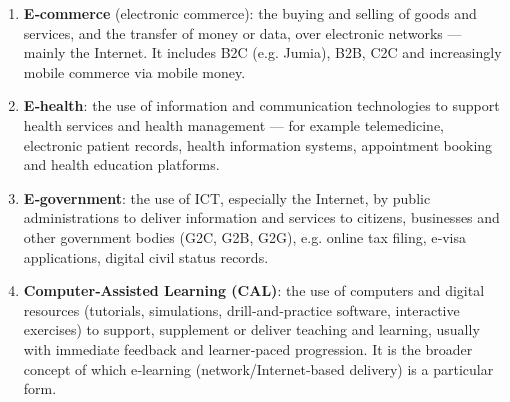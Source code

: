 \documentclass[11pt]{article}
\begin{document}
\begin{corrige}
\begin{enumerate}
\item \textbf{E‑commerce} (electronic commerce): the buying and selling of goods and services, and the transfer of money or data, over electronic networks — mainly the Internet. It includes B2C (e.g. Jumia), B2B, C2C and increasingly mobile commerce via mobile money.

\item \textbf{E‑health}: the use of information and communication technologies to support health services and health management — for example telemedicine, electronic patient records, health information systems, appointment booking and health education platforms.

\item \textbf{E‑government}: the use of ICT, especially the Internet, by public administrations to deliver information and services to citizens, businesses and other government bodies (G2C, G2B, G2G), e.g. online tax filing, e‑visa applications, digital civil status records.

\item \textbf{Computer‑Assisted Learning (CAL)}: the use of computers and digital resources (tutorials, simulations, drill‑and‑practice software, interactive exercises) to support, supplement or deliver teaching and learning, usually with immediate feedback and learner‑paced progression. It is the broader concept of which e‑learning (network/Internet‑based delivery) is a particular form.
\end{enumerate}
\end{corrige}
\end{document}
